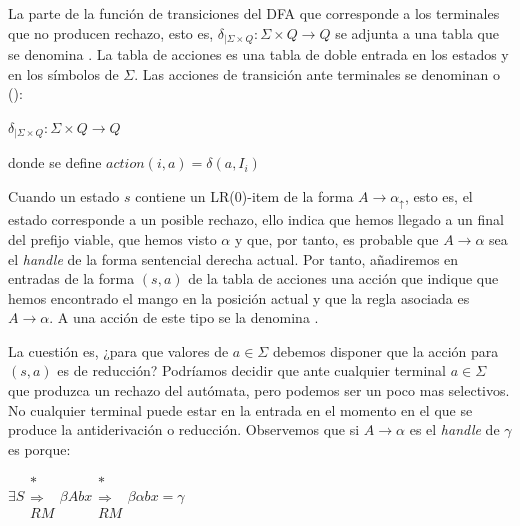La parte de la función de transiciones
del DFA que corresponde a los terminales que no producen rechazo, 
esto es, $\delta_{| \Sigma \times Q} :  \Sigma \times Q \rightarrow Q$
se adjunta a una tabla que se denomina .
La tabla de acciones es una tabla de doble entrada en los estados
y en los símbolos de $\Sigma$.
Las acciones de transición ante terminales 
se denominan  o ():

\begin{center}
$\delta_{| \Sigma \times Q} :  \Sigma \times Q \rightarrow Q$

donde se define $action(i, a) = \delta(a,I_i)$
\end{center}

Cuando un estado $s$ contiene un LR(0)-item de la forma 
$A \rightarrow \alpha_\uparrow$, 
esto es, el estado corresponde a un posible rechazo,
ello indica que hemos llegado a un final del prefijo viable, que hemos
visto $\alpha$ y que, por tanto, es probable que $A \rightarrow \alpha$
sea el \emph{handle} de la forma sentencial derecha actual. Por tanto,
añadiremos en entradas de la forma $(s,a)$ de la tabla de acciones 
una acción que indique que hemos encontrado el mango en la 
posición actual y que la regla asociada es $A \rightarrow \alpha$.
A una acción de este tipo se la denomina .

La cuestión es, ¿para que valores de $a \in \Sigma$ debemos disponer que
la acción para $(s, a)$ es de reducción?
Podríamos decidir que ante cualquier terminal $a \in \Sigma$
que produzca un rechazo del autómata, pero podemos ser un poco mas
selectivos. No cualquier terminal puede estar en la entrada en el momento
en el que se produce la antiderivación o reducción. 
Observemos que si $A \rightarrow \alpha$ es el \emph{handle}
de $\gamma$ es porque:

\begin{center}
$\exists S \begin{array}{c} *\\ \Longrightarrow \\ {\scriptstyle RM} \end{array} \beta A b x \begin{array}{c} *\\ \Longrightarrow \\ {\scriptstyle RM} \end{array}  
\beta \alpha b x = \gamma$
\end{center}


